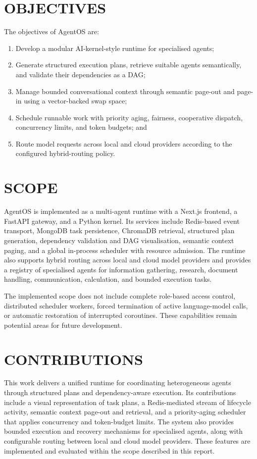 \section{\uppercase{Objectives}}
The objectives of AgentOS are:
\begin{enumerate}
\item Develop a modular AI-kernel-style runtime for specialised agents;
\item Generate structured execution plans, retrieve suitable agents semantically, and validate their dependencies as a DAG;
\item Manage bounded conversational context through semantic page-out and page-in using a vector-backed swap space;
\item Schedule runnable work with priority aging, fairness, cooperative dispatch, concurrency limits, and token budgets; and
\item Route model requests across local and cloud providers according to the configured hybrid-routing policy.
\end{enumerate}

\section{\uppercase{Scope}}
AgentOS is implemented as a multi-agent runtime with a Next.js frontend, a FastAPI gateway, and a Python kernel. Its services include Redis-based event transport, MongoDB task persistence, ChromaDB retrieval, structured plan generation, dependency validation and DAG visualisation, semantic context paging, and a global in-process scheduler with resource admission. The runtime also supports hybrid routing across local and cloud model providers and provides a registry of specialised agents for information gathering, research, document handling, communication, calculation, and bounded execution tasks.

The implemented scope does not include complete role-based access control, distributed scheduler workers, forced termination of active language-model calls, or automatic restoration of interrupted coroutines. These capabilities remain potential areas for future development.

\section{\uppercase{Contributions}}
This work delivers a unified runtime for coordinating heterogeneous agents through structured plans and dependency-aware execution. Its contributions include a visual representation of task plans, a Redis-mediated stream of lifecycle activity, semantic context page-out and retrieval, and a priority-aging scheduler that applies concurrency and token-budget limits. The system also provides bounded execution and recovery mechanisms for specialised agents, along with configurable routing between local and cloud model providers. These features are implemented and evaluated within the scope described in this report.

